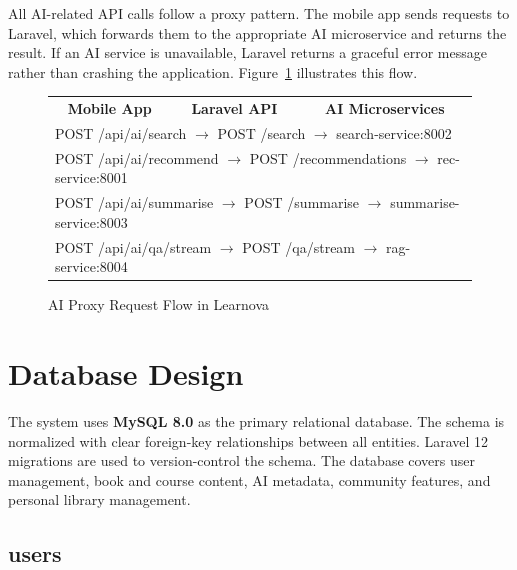 All AI-related API calls follow a proxy pattern. The mobile app sends requests
to Laravel, which forwards them to the appropriate AI microservice and returns
the result. If an AI service is unavailable, Laravel returns a graceful error
message rather than crashing the application. Figure~\ref{fig:proxy} illustrates
this flow.

\begin{figure}[H]
\centering
\begin{tabular}{ccc}
\textbf{Mobile App} & \textbf{Laravel API} & \textbf{AI Microservices} \\[6pt]
\multicolumn{3}{l}{POST /api/ai/search $\longrightarrow$ POST /search $\longrightarrow$ search-service:8002} \\
\multicolumn{3}{l}{POST /api/ai/recommend $\longrightarrow$ POST /recommendations $\longrightarrow$ rec-service:8001} \\
\multicolumn{3}{l}{POST /api/ai/summarise $\longrightarrow$ POST /summarise $\longrightarrow$ summarise-service:8003} \\
\multicolumn{3}{l}{POST /api/ai/qa/stream $\longrightarrow$ POST /qa/stream $\longrightarrow$ rag-service:8004} \\
\end{tabular}
\caption{AI Proxy Request Flow in Learnova}
\label{fig:proxy}
\end{figure}

\section{Database Design}
\label{sec:ch4db}

The system uses \textbf{MySQL 8.0} as the primary relational database. The
schema is normalized with clear foreign-key relationships between all entities.
Laravel 12 migrations are used to version-control the schema. The database
covers user management, book and course content, AI metadata, community
features, and personal library management.

\subsection{users}

